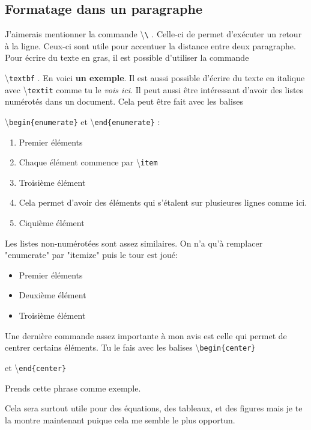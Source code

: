 \documentclass[a4paper, 10pt]{article}
\newcommand{\command}[1]{
  \colorbox{codebackground}{\scriptsize{\textbackslash}\texttt{#1}}
}
\begin{document}
\subsection{Formatage dans un paragraphe}

J'aimerais mentionner la commande \command{\textbackslash}. Celle-ci de
permet d'exécuter un retour à la ligne. Ceux-ci sont utile pour accentuer la
distance entre deux paragraphe. \\

Pour écrire du texte en gras, il est possible d'utiliser la commande
\command{textbf}. En voici \textbf{un exemple}. Il est aussi possible
d'écrire du texte en italique avec \command{textit} comme tu le
\textit{vois ici}. Il peut aussi être intéressant d'avoir des listes numérotés
dans un document. Cela peut être fait avec les balises
\command{begin\{enumerate\}} et \command{end\{enumerate\}}:

\begin{enumerate}
  \item Premier éléments
  \item Chaque élément commence par \command{item}
  \item Troisième élément
  \item Cela permet d'avoir des
    éléments qui s'étalent
    sur plusieures lignes comme ici.
  \item Ciquième élément \\
\end{enumerate}

Les listes non-numérotées sont assez similaires. On n'a qu'à remplacer
"enumerate" par "itemize" puis le tour est joué:

\begin{itemize}
  \item Premier éléments
  \item Deuxième élément
  \item Troisième élément \\
\end{itemize}

Une dernière commande assez importante à mon avis est celle qui permet de
centrer certains éléments. Tu le fais avec les balises \command{begin\{center\}}
et \command{end\{center\}}

\begin{center}
Prends cette phrase comme exemple.
\end{center}

Cela sera surtout utile pour des équations, des tableaux, et des figures
mais je te la montre maintenant puique cela me semble le plus opportun.
\end{document}
